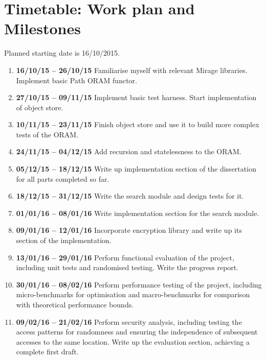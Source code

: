 \documentclass[12pt,a4paper,twoside]{article}
\begin{document}
\section*{Timetable: Work plan and Milestones}

Planned starting date is 16/10/2015.

\begin{enumerate}

\item {\bf 16/10/15 -- 26/10/15} Familiarise myself with relevant Mirage libraries. Implement basic Path ORAM functor.

\item {\bf 27/10/15 -- 09/11/15} Implement basic test harness. Start implementation of object store.

\item {\bf 10/11/15 -- 23/11/15} Finish object store and use it to build more complex tests of the ORAM.

\item {\bf 24/11/15 -- 04/12/15} Add recursion and statelessness to the ORAM.

\item {\bf 05/12/15 -- 18/12/15} Write up implementation section of the dissertation for all parts completed so far.

\item {\bf 18/12/15 -- 31/12/15} Write the search module and design tests for it.

\item {\bf 01/01/16 -- 08/01/16} Write implementation section for the search module.

\item {\bf 09/01/16 -- 12/01/16} Incorporate encryption library and write up its section of the implementation.

\item {\bf 13/01/16 -- 29/01/16} Perform functional evaluation of the project, including unit tests and randomised testing. Write the progress report.

\item {\bf 30/01/16 -- 08/02/16} Perform performance testing of the project, including micro-benchmarks for optimisation and macro-benchmarks for comparison with theoretical performance bounds.

\item {\bf 09/02/16 -- 21/02/16} Perform security analysis, including testing the access patterns for randomness and ensuring the independence of subsequent accesses to the same location. Write up the evaluation section, achieving a complete first draft.


\end{enumerate}
\end{document}
